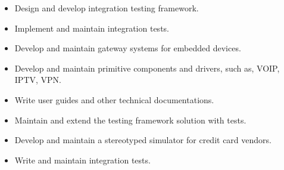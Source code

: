 \documentclass[10pt,a4paper,ragged2e,withhyper]{altacv}
\begin{document}
\begin{itemize}
\item Design and develop integration testing framework.
\item Implement and maintain integration tests.
\end{itemize}
\divider

\begin{itemize}
\item Develop and maintain gateway systems for embedded devices.
\item Develop and maintain primitive components and drivers, such as, VOIP, IPTV, VPN.
\item Write user guides and other technical documentations.
\item Maintain and extend the testing framework solution with tests.
\end{itemize}
\divider

\begin{itemize}
\item Develop and maintain a stereotyped simulator for credit card vendors.
\item Write and maintain integration tests.
\end{itemize}






      

\divider


          \cvtag{\LaTeX{}}    

\divider

\divider


\end{document}
